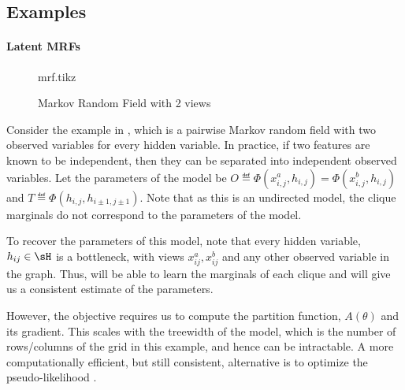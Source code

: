 \subsection{Examples}

\paragraph{Latent MRFs}

\begin{figure}
  \label{fig:examples-mrf}
  \centering
  {mrf.tikz}
  \caption{Markov Random Field with 2 views}
\end{figure}

Consider the example in , which is a pairwise Markov
  random field with two observed variables for every hidden variable. 
In practice, if two features are known to be independent, then they can
  be separated into independent observed variables.
Let the parameters of the model be $O \eqdef \Phi(x^a_{i,j}, h_{i,j})
  = \Phi(x^b_{i,j}, h_{i,j})$ and $T \eqdef \Phi(h_{i,j}, h_{i \pm 1,j \pm 1})$. 
Note that as this is an undirected model, the clique marginals do not
  correspond to the parameters of the model.

To recover the parameters of this model, note that every hidden
  variable, $h_{ij} \in \sH$ is a bottleneck, with views
  $x^{a}_{ij},x^{b}_{ij}$ and any other observed variable in the graph. 
Thus, \LearnMarginals will be able to learn the marginals of each clique
  and \LearnLogLinear will give us a consistent estimate of the
  parameters. 

However, the objective  requires us to compute the
  partition function, $A(\theta)$ and its gradient. 
This scales with the treewidth of the model, which is the number
  of rows/columns of the grid in this example, and hence can be
  intractable.
A more computationally efficient, but still consistent, alternative is
to optimize the pseudo-likelihood .


